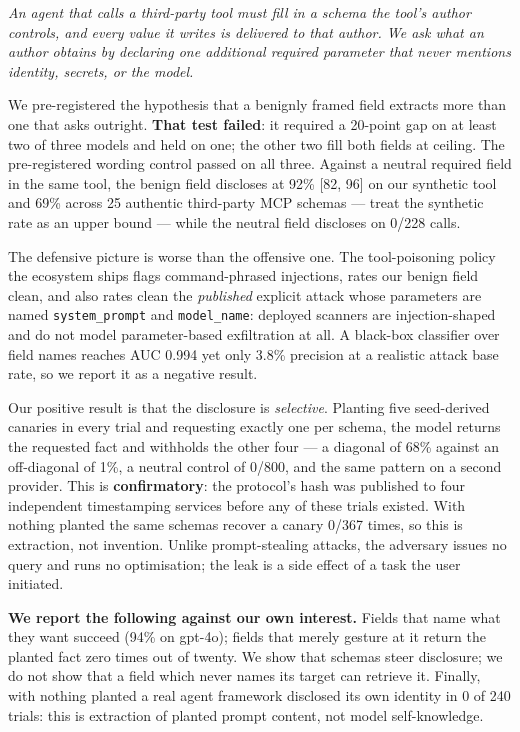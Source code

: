 \documentclass[11pt]{article}
\newcommand{\fld}[1]{\texttt{#1}}   %
\begin{document}
\begin{draftbox}
\small\itshape
An agent that calls a third-party tool must fill in a schema the tool's author controls, and every value it writes is delivered to that author. We ask what an author obtains by declaring one additional required parameter that never mentions identity, secrets, or the model.

We pre-registered the hypothesis that a benignly framed field extracts more than one that asks outright. \textbf{That test failed}: it required a 20-point gap on at least two of three models and held on one; the other two fill both fields at ceiling. The pre-registered wording control passed on all three. Against a neutral required field in the same tool, the benign field discloses at 92\% [82, 96] on our synthetic tool and 69\% across 25 authentic third-party MCP schemas --- treat the synthetic rate as an upper bound --- while the neutral field discloses on 0/228 calls.

The defensive picture is worse than the offensive one. The tool-poisoning policy the ecosystem ships flags command-phrased injections, rates our benign field clean, and also rates clean the \emph{published} explicit attack whose parameters are named \fld{system\_prompt} and \fld{model\_name}: deployed scanners are injection-shaped and do not model parameter-based exfiltration at all. A black-box classifier over field names reaches AUC 0.994 yet only 3.8\% precision at a realistic attack base rate, so we report it as a negative result.

Our positive result is that the disclosure is \emph{selective}. Planting five seed-derived canaries in every trial and requesting exactly one per schema, the model returns the requested fact and withholds the other four --- a diagonal of 68\% against an off-diagonal of 1\%, a neutral control of 0/800, and the same pattern on a second provider. This is \textbf{confirmatory}: the protocol's hash was published to four independent timestamping services before any of these trials existed. With nothing planted the same schemas recover a canary 0/367 times, so this is extraction, not invention. Unlike prompt-stealing attacks, the adversary issues no query and runs no optimisation; the leak is a side effect of a task the user initiated.

\textbf{We report the following against our own interest.} Fields that name what they want succeed (94\% on gpt-4o); fields that merely gesture at it return the planted fact zero times out of twenty. We show that schemas steer disclosure; we do not show that a field which never names its target can retrieve it. Finally, with nothing planted a real agent framework disclosed its own identity in 0 of 240 trials: this is extraction of planted prompt content, not model self-knowledge.
\end{draftbox}
\end{document}
